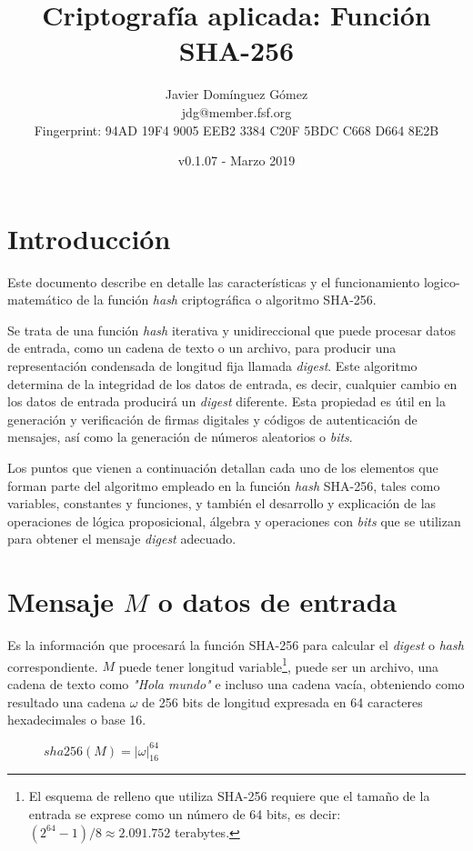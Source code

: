 \documentclass{article}
\title{\textbf{Criptografía aplicada: Función SHA-256}}
\author{Javier Domínguez Gómez \\
\small{jdg@member.fsf.org} \\
\small{Fingerprint: 94AD 19F4 9005 EEB2 3384 C20F 5BDC C668 D664 8E2B}}
\date{v0.1.07 - Marzo 2019}
\begin{document}
\maketitle

\tableofcontents{}

\section{Introducción}
    Este documento describe en detalle las características y el funcionamiento logico-matemático de la función \textit{hash} criptográfica o algoritmo SHA-256.
    
    \vspace{3mm}
    Se trata de una función \textit{hash} iterativa y unidireccional que puede procesar datos de entrada, como un cadena de texto o un archivo, para producir una representación condensada de longitud fija llamada \textit{digest}. Este algoritmo determina de la integridad de los datos de entrada, es decir, cualquier cambio en los datos de entrada producirá un \textit{digest} diferente. Esta propiedad es útil en la generación y verificación de firmas digitales y códigos de autenticación de mensajes, así como la generación de números aleatorios o \textit{bits}.
    
    \vspace{3mm}
    Los puntos que vienen a continuación detallan cada uno de los elementos que forman parte del algoritmo empleado en la función \textit{hash} SHA-256, tales como variables, constantes y funciones, y también el desarrollo y explicación de las operaciones de lógica proposicional, álgebra y operaciones con \textit{bits} que se utilizan para obtener el mensaje \textit{digest} adecuado.

\section{Mensaje $M$ o datos de entrada}
    Es la información que procesará la función SHA-256 para calcular el \textit{digest} o \textit{hash} correspondiente. $M$ puede tener longitud variable\footnote{El esquema de relleno que utiliza SHA-256 requiere que el tamaño de la entrada se exprese como un número de 64 bits, es decir: $(2^{64}-1)/8 \approx 2.091.752$ terabytes.}, puede ser un archivo, una cadena de texto como \textit{"Hola mundo"} e incluso una cadena vacía, obteniendo como resultado una cadena $\omega$ de 256 bits de longitud expresada en 64 caracteres hexadecimales o base 16.
        \begin{figure}[H]
        \centering
            $sha256(M) = |\omega|^{64}_{16}$
        \end{figure}
        
\end{document}
